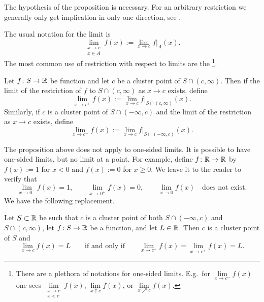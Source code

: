 The hypothesis of the proposition is necessary.  For an arbitrary
restriction we generally only get implication in only one direction,
see .  

The usual notation for the limit is
\begin{equation*}
\lim_{\substack{x \to c\\x \in A}} f(x) := \lim_{x \to c} f|_A(x) .
\end{equation*}
The most common use of restriction with respect to limits
are the \emph{}%
\footnote{%
There are a plethora of notations for one-sided limits.  E.g.\ for
$\lim\limits_{x \to c^-} f(x)$ one sees
$\lim\limits_{\substack{x \to c\\x < c}} f(x)$,
$\lim\limits_{x \uparrow c} f(x)$, or
$\lim\limits_{x \nearrow c} f(x)$.}.

\begin{defn} \label{defn:onesidedlimits}
Let $f \colon S \to {\mathbb{R}}$ be function and let $c$ be a cluster point of
$S \cap (c,\infty)$.  Then if the limit
of the restriction of $f$ to $S \cap (c,\infty)$ 
 as $x \to c$ exists, define
\begin{equation*}
\lim_{x \to c^+} f(x) := \lim_{x\to c} f|_{S \cap (c,\infty)}(x) .
\end{equation*}
Similarly, if $c$ is a cluster point of 
$S \cap (-\infty,c)$ and the limit of the restriction as $x \to c$
exists, define
\begin{equation*}
\lim_{x \to c^-} f(x) := \lim_{x\to c} f|_{S \cap (-\infty,c)}(x) .
\end{equation*}
\end{defn}

The proposition above does not apply to one-sided limits.
It is possible to have one-sided limits, but no limit at a point.  For
example, define $f \colon {\mathbb{R}} \to {\mathbb{R}}$ by $f(x) := 1$ for $x < 0$ and
$f(x) :=
0$ for $x \geq 0$.  We leave it to the reader to verify that
\begin{equation*}
\lim_{x \to 0^-} f(x) = 1, \qquad
\lim_{x \to 0^+} f(x) = 0, \qquad
\lim_{x \to 0} f(x) \quad \text{does not exist.}
\end{equation*}
We have the following replacement.


\begin{prop} \label{prop:onesidedlimits}
Let $S \subset {\mathbb{R}}$ be such that $c$ is a cluster point
of both $S \cap (-\infty,c)$ and $S \cap (c,\infty)$, let
$f \colon S \to {\mathbb{R}}$ be a function, and let $L \in {\mathbb{R}}$.  Then $c$ is a cluster point of $S$ and
\begin{equation*}
\lim_{x \to c} f(x) = L
\qquad \text{if and only if} \qquad
\lim_{x \to c^-} f(x) =
\lim_{x \to c^+} f(x) =
L .
\end{equation*}
\end{prop}

